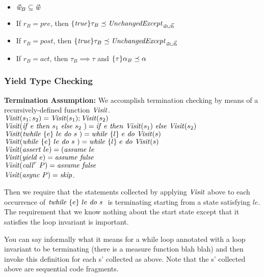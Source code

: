 \begin{itemize}
\item $\vec{\mathit{w}}_{B} \subseteq \vec{\mathit{w}}$
\item If $r_{B} = \mathit{pre}$, then $\{ {\mathit{true}} \} {\tau_{B}} \preceq {\mathit{UnchangedExcept}_{ {\vec{\mathit{w}}\cup \vec{h}} }}$ 
\item If $r_{B} = \mathit{post}$, then $\{ {\mathit{true}} \} {\tau_{B}} \preceq {\mathit{UnchangedExcept}_{ {\vec{\mathit{w}}\cup \vec{h}} }}$ 
\item If $r_{B} = \mathit{act}$, then $\tau_{B} \implies \tau$ and $\{ {\tau} \} {\alpha_{B}} \preceq {\alpha}$
\end{itemize}

\subsubsection{Yield Type Checking}

{\bf Termination Assumption:}
We accomplish termination checking by means of a recursively-defined function ${\mathit{Visit}}$. 
\\

\noindent
${\mathit{Visit}}(s_1; s_2) = {\mathit{Visit}}(s_1); {\mathit{Visit}}(s_2)$\\
${\mathit{Visit}}({\mathit{if}\ {e}\ }{\mathit{then}\ {s_1}\ }{\mathit{else}\ { s_2}\ }) = {\mathit{if}\ {e}\ }{\mathit{then}\ {{\mathit{Visit}}(s_1)}\ }{\mathit{else}\ {{\mathit{Visit}}(s_2)}\ }$\\
${\mathit{Visit}}(\mathit{twhile}\ \{{e}\}\ {{le}\ } \mathit{do}\ {{s}\ }) = \mathit{while}\ \{{l}\}\ {{e}\ } \mathit{do}\ {{{\mathit{Visit}}(s)}\ }$\\
${\mathit{Visit}}(\mathit{while}\ \{{e}\}\ {{le}\ } \mathit{do}\ {{s}\ }) = \mathit{while}\ \{{l}\}\ {{e}\ } \mathit{do}\ {{{\mathit{Visit}}(s)}\ }$\\
${\mathit{Visit}}(\mathit{assert}\ le) = (\mathit{assume}\ le$\\
${\mathit{Visit}}(\mathit{yield}\ e) = \mathit{assume}\ \mathit{false}$\\
${\mathit{Visit}}(\mathit{call}^{{r}}\ P) = \mathit{assume}\ \mathit{false}$\\
${\mathit{Visit}}(\mathit{async}\ P) =\mathit{skip}$.


Then we require that the statements collected by applying ${\mathit{Visit}}$ above to each occurrence of $\mathit{twhile}\ \{{e}\}\ {{le}\ } \mathit{do}\ {{s}\ }$ is terminating starting from a state satisfying $le$.  The requirement that we know nothing about the start state except that it satisfies the loop invariant is important.

You can say informally what it means for a while loop annotated with a loop invariant to be terminating (there is a measure function blah blah) and then invoke this definition for each s' collected as above.  Note that the s' collected above are sequential code fragments.  

